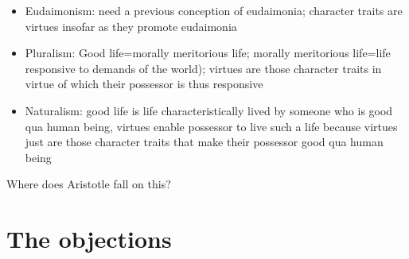 \documentclass[11pt]{article}
\begin{document}
\begin{itemize}\item{Eudaimonism: need a previous conception of eudaimonia; character traits are virtues insofar as they promote eudaimonia}\item{Pluralism: Good life=morally meritorious life; morally meritorious life=life responsive to demands of the world); virtues are those character traits in virtue of which their possessor is thus responsive}\item{Naturalism: good life is life characteristically lived by someone who is good qua human being, virtues enable possessor to live such a life because virtues just are those character traits that make their possessor good qua human being}\end{itemize}

\noindent Where does Aristotle fall on this?

\section{The objections}
\end{document}
